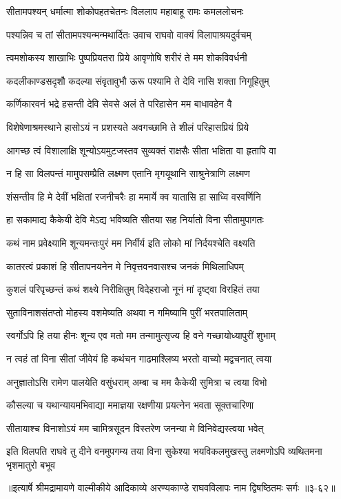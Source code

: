 
\twolineshloka
{सीतामपश्यन् धर्मात्मा शोकोपहतचेतनः}
{विललाप महाबाहू रामः कमललोचनः} %

\twolineshloka
{पश्यन्निव च तां सीतामपश्यन्मन्मथार्दितः}
{उवाच राघवो वाक्यं विलापाश्रयदुर्वचम्} %

\twolineshloka
{त्वमशोकस्य शाखाभिः पुष्पप्रियतरा प्रिये}
{आवृणोषि शरीरं ते मम शोकविवर्धनी} %

\twolineshloka
{कदलीकाण्डसदृशौ कदल्या संवृतावुभौ}
{ऊरू पश्यामि ते देवि नासि शक्ता निगूहितुम्} %

\twolineshloka
{कर्णिकारवनं भद्रे हसन्ती देवि सेवसे}
{अलं ते परिहासेन मम बाधावहेन वै} %

\twolineshloka
{विशेषेणाश्रमस्थाने हासोऽयं न प्रशस्यते}
{अवगच्छामि ते शीलं परिहासप्रियं प्रिये} %

\twolineshloka
{आगच्छ त्वं विशालाक्षि शून्योऽयमुटजस्तव}
{सुव्यक्तं राक्षसैः सीता भक्षिता वा हृतापि वा} %

\twolineshloka
{न हि सा विलपन्तं मामुपसम्प्रैति लक्ष्मण}
{एतानि मृगयूथानि साश्रुनेत्राणि लक्ष्मण} %

\twolineshloka
{शंसन्तीव हि मे देवीं भक्षितां रजनीचरैः}
{हा ममार्ये क्व यातासि हा साध्वि वरवर्णिनि} %

\twolineshloka
{हा सकामाद्य कैकेयी देवि मेऽद्य भविष्यति}
{सीतया सह निर्यातो विना सीतामुपागतः} %

\twolineshloka
{कथं नाम प्रवेक्ष्यामि शून्यमन्तःपुरं मम}
{निर्वीर्य इति लोको मां निर्दयश्चेति वक्ष्यति} %

\twolineshloka
{कातरत्वं प्रकाशं हि सीतापनयनेन मे}
{निवृत्तवनवासश्च जनकं मिथिलाधिपम्} %

\twolineshloka
{कुशलं परिपृच्छन्तं कथं शक्ष्ये निरीक्षितुम्}
{विदेहराजो नूनं मां दृष्ट्वा विरहितं तया} %

\twolineshloka
{सुताविनाशसंतप्तो मोहस्य वशमेष्यति}
{अथवा न गमिष्यामि पुरीं भरतपालिताम्} %

\twolineshloka
{स्वर्गोऽपि हि तया हीनः शून्य एव मतो मम}
{तन्मामुत्सृज्य हि वने गच्छायोध्यापुरीं शुभाम्} %

\twolineshloka
{न त्वहं तां विना सीतां जीवेयं हि कथंचन}
{गाढमाश्लिष्य भरतो वाच्यो मद्वचनात् त्वया} %

\twolineshloka
{अनुज्ञातोऽसि रामेण पालयेति वसुंधराम्}
{अम्बा च मम कैकेयी सुमित्रा च त्वया विभो} %

\twolineshloka
{कौसल्या च यथान्यायमभिवाद्या ममाज्ञया}
{रक्षणीया प्रयत्नेन भवता सूक्तचारिणा} %

\twolineshloka
{सीतायाश्च विनाशोऽयं मम चामित्रसूदन}
{विस्तरेण जनन्या मे विनिवेद्यस्त्वया भवेत्} %

\twolineshloka
{इति विलपति राघवे तु दीने वनमुपगम्य तया विना सुकेश्या}
{भयविकलमुखस्तु लक्ष्मणोऽपि व्यथितमना भृशमातुरो बभूव} %


॥इत्यार्षे श्रीमद्रामायणे वाल्मीकीये आदिकाव्ये अरण्यकाण्डे राघवविलापः नाम द्विषष्ठितमः सर्गः ॥३-६२॥
